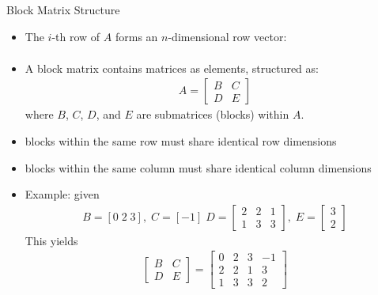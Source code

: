 \begin{frame}{Block Matrix Structure}
\begin{itemize}
    \item The $i$-th row of $A$ forms an $n$-dimensional row vector:
    \begin{align*}
        [ A_{i1}, \cdots, A_{in}]
    \end{align*}
    \item A block matrix contains matrices as elements, structured as:
    \begin{align*}
        A = \begin{bmatrix}
            B & C \\
            D & E
        \end{bmatrix}
    \end{align*}
    where $B$, $C$, $D$, and $E$ are submatrices (blocks) within $A$.
\end{itemize}
\end{frame}

\begin{frame}{}
\begin{itemize}
    \item blocks within the same row must share identical row dimensions
    \item blocks within the same column must share identical column dimensions
    \item Example: given 
    \begin{align*}
        B = [ 0 \; 2 \; 3 ], \; C = [-1] \; D = \begin{bmatrix}
            2 & 2& 1\\
            1 & 3 & 3
        \end{bmatrix}, \; E = \begin{bmatrix}
            3\\
            2
        \end{bmatrix}
    \end{align*}
    This yields 
    \begin{align*}
        \begin{bmatrix}
            B & C \\
            D & E 
        \end{bmatrix} = \begin{bmatrix}
            0 & 2 & 3 &-1\\
            2 & 2 & 1 & 3 \\
            1 & 3 & 3 & 2
        \end{bmatrix}
    \end{align*}
\end{itemize}
\end{frame}

